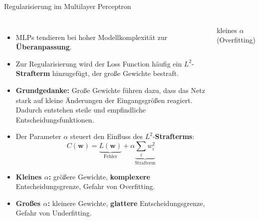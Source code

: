 \begin{frame}{Regularisierung im Multilayer Perceptron}
\footnotesize
\begin{columns}
\begin{itemize}
  \item MLPs tendieren bei hoher Modellkomplexität zur \textbf{Überanpassung}.
  \item Zur Regularisierung wird der Loss Function häufig ein
        $L^2$-\textbf{Strafterm} hinzugefügt, der große Gewichte bestraft.
  \item \textbf{Grundgedanke:} Große Gewichte führen dazu, dass das Netz stark auf kleine Änderungen der Eingangsgrößen reagiert.
        Dadurch entstehen steile und empfindliche Entscheidungsfunktionen.
  \item Der Parameter $\alpha$ steuert den Einfluss des $L^2$-\textbf{Strafterms}:
\[
C(\mathbf{w})=\underbrace{L(\mathbf{w})}_{\text{Fehler}}+\alpha\underbrace{\textstyle\sum_i w_i^2}_{\text{Strafterm}}
\]
  \item \textbf{Kleines $\alpha$:} größere Gewichte, \textbf{komplexere} Entscheidungsgrenze,
        Gefahr von Overfitting.
  \item \textbf{Großes $\alpha$:} kleinere Gewichte, \textbf{glattere} Entscheidungsgrenze,
        Gefahr von Underfitting.
\end{itemize}

\centering
{\footnotesize kleines $\alpha$ (Overfitting)}\\[2pt]


\end{columns}
\end{frame}
